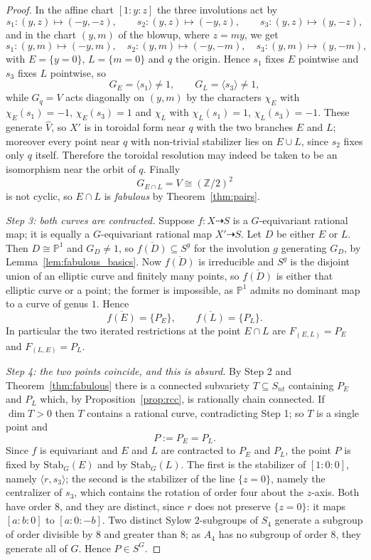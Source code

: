 \documentclass[11pt]{amsart}
\theoremstyle{plain}
\theoremstyle{definition}
\theoremstyle{remark}
\numberwithin{equation}{section}
\begin{document}
\begin{proof}
In the affine chart $[1:y:z]$ the three involutions act by
\[
s_1 : (y,z) \mapsto (-y,-z), \qquad
s_2 : (y,z) \mapsto (-y,z), \qquad
s_3 : (y,z) \mapsto (y,-z) ,
\]
and in the chart $(y,m)$ of the blowup, where $z = my$, we get
\[
s_1 : (y,m) \mapsto (-y,m), \quad
s_2 : (y,m) \mapsto (-y,-m), \quad
s_3 : (y,m) \mapsto (y,-m) ,
\]
with $E = \{y = 0\}$, $L = \{m=0\}$ and $q$ the origin.  Hence $s_1$ fixes
$E$ pointwise and $s_3$ fixes $L$ pointwise, so
\[
G_E = \langle s_1 \rangle \neq 1 , \qquad
G_L = \langle s_3 \rangle \neq 1 ,
\]
while $G_q = V$ acts diagonally on $(y,m)$ by the characters $\chi_E$ with
$\chi_E(s_1) = -1$, $\chi_E(s_3) = 1$ and $\chi_L$ with $\chi_L(s_1) = 1$,
$\chi_L(s_3) = -1$.  These generate $\widehat{V}$, so $X'$ is in toroidal
form near $q$ with the two branches $E$ and $L$; moreover every point near
$q$ with non-trivial stabilizer lies on $E \cup L$, since $s_2$ fixes only
$q$ itself.  Therefore the toroidal resolution may indeed be taken to be an
isomorphism near the orbit of $q$.  Finally
\[
G_{E \cap L} = V \cong (\mathbb{Z}/2)^2
\]
is not cyclic, so $E \cap L$ is \emph{fabulous} by
Theorem~\ref{thm:pairs}.

\emph{Step 3: both curves are contracted.}  Suppose $f : X \dasharrow S$ is
a $G$-equivariant rational map; it is equally a $G$-equivariant rational
map $X' \dasharrow S$.  Let $D$ be either $E$ or $L$.  Then $D \cong
\mathbb{P}^1$ and $G_D \neq 1$, so $\overline{f(D)} \subseteq S^{g}$ for the
involution $g$ generating $G_D$, by Lemma~\ref{lem:fabulous_basics}.  Now
$\overline{f(D)}$ is irreducible and $S^g$ is the disjoint union of an
elliptic curve and finitely many points, so $\overline{f(D)}$ is either
that elliptic curve or a point; the former is impossible, as $\mathbb{P}^1$
admits no dominant map to a curve of genus $1$.  Hence
\[
\overline{f(E)} = \{P_E\}, \qquad \overline{f(L)} = \{P_L\} .
\]
In particular the two iterated restrictions at the point $E \cap L$ are
$F_{(E,L)} = P_E$ and $F_{(L,E)} = P_L$.

\emph{Step 4: the two points coincide, and this is absurd.}  By Step 2 and
Theorem~\ref{thm:fabulous} there is a connected subvariety $T \subseteq
S_{nt}$ containing $P_E$ and $P_L$ which, by
Proposition~\ref{prop:rcc}, is rationally chain connected.  If $\dim T > 0$
then $T$ contains a rational curve, contradicting Step 1; so $T$ is a
single point and
\[
P := P_E = P_L .
\]
Since $f$ is equivariant and $E$ and $L$ are contracted to $P_E$ and $P_L$,
the point $P$ is fixed by $\mathrm{Stab}_G(E)$ and by $\mathrm{Stab}_G(L)$.
The first is the stabilizer of $[1:0:0]$, namely $\langle r, s_3\rangle$;
the second is the stabilizer of the line $\{z=0\}$, namely the centralizer
of $s_3$, which contains the rotation of order four about the $z$-axis.
Both have order $8$, and they are distinct, since $r$ does not preserve
$\{z=0\}$: it maps $[a:b:0]$ to $[a:0:-b]$.  Two distinct Sylow
$2$-subgroups of $S_4$ generate a subgroup of order divisible by $8$ and
greater than $8$; as $A_4$ has no subgroup of order $8$, they generate all
of $G$.  Hence $P \in S^G$.


\end{proof}
\end{document}
